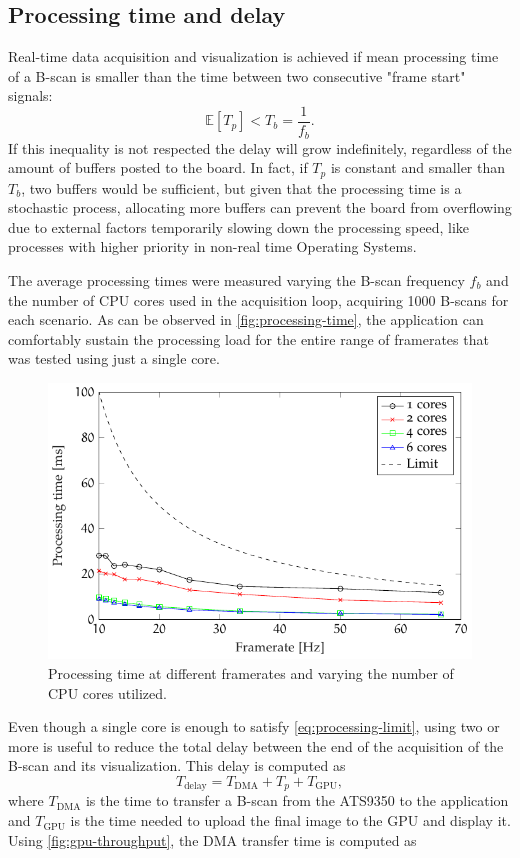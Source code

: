 \subsection{Processing time and delay}
Real-time data acquisition and visualization is achieved if mean processing time of a B-scan is smaller than the time between two consecutive "frame start" signals:
\begin{equation}\label{eq:processing-limit}
	\mathbb{E}[T_p] < T_b = \frac{1}{f_b}.
\end{equation}
If this inequality is not respected the delay will grow indefinitely, regardless of the amount of buffers posted to the board. In fact, if $T_p$ is constant and smaller than $T_b$, two buffers would be sufficient, but given that the processing time is a stochastic process, allocating more buffers can prevent the board from overflowing due to external factors temporarily slowing down the processing speed, like processes with higher priority in non-real time Operating Systems. 

The average processing times were measured varying the B-scan frequency $f_b$ and the number of CPU cores used in the acquisition loop, acquiring 1000 B-scans for each scenario. As can be observed in \autoref{fig:processing-time}, the application can comfortably sustain the processing load for the entire range of framerates that was tested using just a single core. 

\begin{figure}[htb]
	\myfloatalign
	\includegraphics[width=0.8\linewidth]{gfx/ch4/processing-time}
	\caption{Processing time at different framerates and varying the number of CPU cores utilized.}\label{fig:processing-time}
\end{figure}

Even though a single core is enough to satisfy \autoref{eq:processing-limit}, using two or more is useful to reduce the total delay between the end of the acquisition of the B-scan and its visualization. This delay is computed as 
\begin{equation}
T_{\text{delay}} = T_{\text{DMA}} + T_p + T_{\text{GPU}},
\end{equation}
where $T_{\text{DMA}}$ is the time to transfer a B-scan from the ATS9350 to the application and $T_{\text{GPU}}$ is the time needed to upload the final image to the GPU and display it. Using \autoref{fig:gpu-throughput}, the DMA transfer time is computed as 


